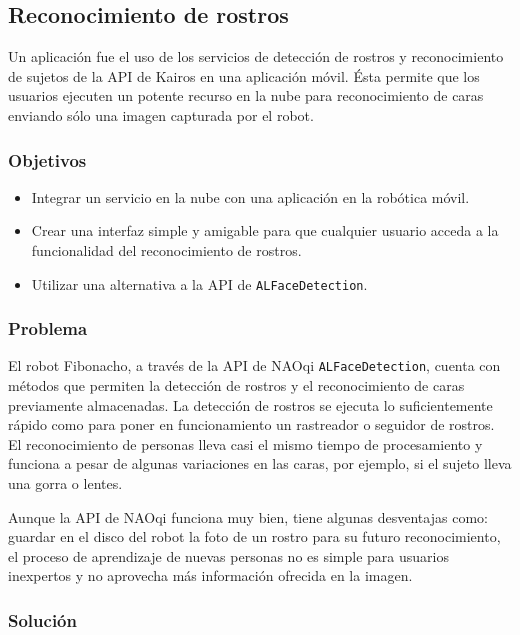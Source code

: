 \subsection{Reconocimiento de rostros}

Un aplicación fue el uso de los servicios de detección de rostros y reconocimiento de sujetos de la API de Kairos en una aplicación móvil. Ésta permite que los usuarios
ejecuten un potente recurso en la nube para reconocimiento
de caras enviando sólo una imagen capturada por el robot.

\subsubsection{Objetivos}

\begin{itemize}
    \item Integrar un servicio en la nube con una aplicación
    en la robótica móvil.
    \item Crear una interfaz simple y amigable para que cualquier usuario acceda a la funcionalidad del reconocimiento de rostros.
    \item Utilizar una alternativa a la API de \texttt{ALFaceDetection}.
\end{itemize}

\subsubsection{Problema}

El robot Fibonacho, a través de la API de NAOqi \texttt{ALFaceDetection},
cuenta con métodos que permiten la detección de rostros
y el reconocimiento de caras previamente almacenadas.
La detección de rostros se ejecuta lo suficientemente rápido como
para poner en funcionamiento un rastreador o seguidor
de rostros. El reconocimiento de personas lleva casi el 
mismo tiempo de procesamiento y funciona a pesar de algunas
variaciones en las caras, por ejemplo, si el sujeto lleva 
una gorra o lentes.

Aunque la API de NAOqi funciona muy bien, tiene
algunas desventajas como: guardar en el disco del robot la foto de un 
rostro para su futuro reconocimiento, el proceso de aprendizaje 
de nuevas personas no es simple para usuarios inexpertos
y no aprovecha más información ofrecida en la imagen.

\subsubsection{Solución}

